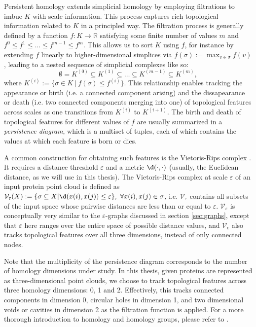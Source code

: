 Persistent homology extends simplicial homology by employing filtrations to
imbue $K$ with scale information. This process captures rich topological
information related to $K$ in a principled way. The
filtration process is generally defined by a function $f: K\to\mathbb{R}$
satisfying some finite number of values $m$ and $f^{0}\leq f^{1}\leq\dots\leq
f^{m-1}\leq f^{m}$. This allows us to sort $K$ using $f$, for instance by
extending $f$ linearly to higher-dimensional simplices via
$f(\sigma):=\max_{v\in\sigma}f(v)$, leading to a nested sequence of simplicial
complexes like so:
\begin{equation}
  \label{eq:nested_simplicial_complexes}
  \emptyset=K^{(0)}\subseteq K^{(1)}\subseteq \dots\subseteq K^{(m-1)}\subseteq K^{(m)},
\end{equation}
where $K^{(i)}:=\{\sigma\in K\ |\ f(\sigma)\leq f^{(i)}\}$. This relationship
enables tracking the appearance or birth (i.e. a connected component arising)
and the dissapearance or death (i.e. two connected components merging into one)
of topological features across scales as one transitions from $K^{(i)}$ to
$K^{(i+1)}$. The birth and death of topological features for different values of
$f$ are usually summarized in a \emph{persistence diagram}, which is a multiset
of tuples, each of which contains the values at which each feature is born or
dies.

A common construction for obtaining such features is the Vietoris-Rips complex
\citep{vietoris1927hoheren}. It requires a distance threshold $\varepsilon$ and
a metric $\d( \cdot, \cdot)$ (usually, the Euclidean distance, as we will
use in this thesis). The Vietoris-Rips complex at scale $\varepsilon$ of an
input protein point cloud is defined as
$\mathcal{V}_{\varepsilon}(X):=\{\sigma\subseteq X| \d(x(i),
x(j))\leq\varepsilon\},\ \forall x(i),x(j)\in\sigma$, i.e.
$\mathcal{V}_{\varepsilon}$ contains all subsets of the input space whose
pairwise distances are less than or equal to $\varepsilon$.
$\mathcal{V}_{\varepsilon}$ is conceptually very similar to the
$\varepsilon$-graphs discussed in section \ref{sec:graphs}, except that
$\varepsilon$ here ranges over the entire space of possible distance values, and
$\mathcal{V}_{\epsilon}$ also tracks topological features over all three
dimensions, instead of only connected nodes.

Note that the multiplicity of the persistence diagram corresponds to the number
of homology dimensions under study. In this thesis, given proteins are
represented as three-dimensional point clouds, we choose to track topological
features across three homology dimensions: 0, 1 and 2. Effectively, this tracks
connected components in dimension 0, circular holes in dimension 1, and two
dimensional voids or cavities in dimension 2 as the filtration function is
applied. For a more thorough introduction to homology and homology groups,
please refer to \cite{edelsbrunner2010computational}.

